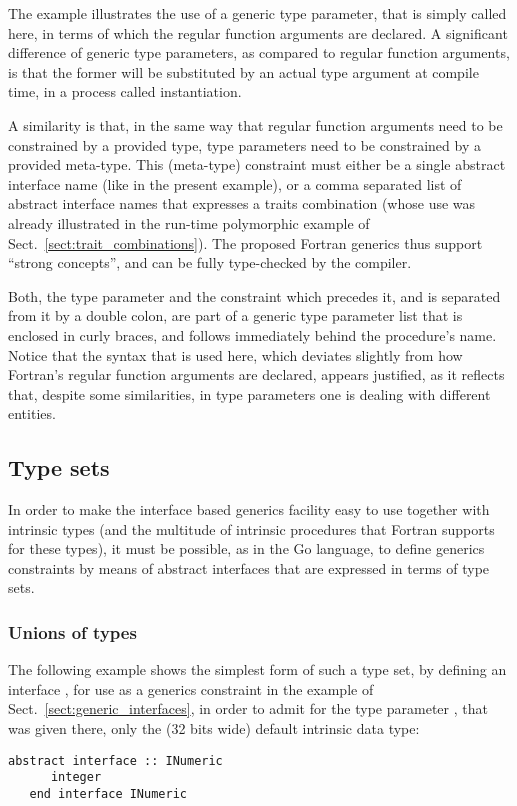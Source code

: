 \documentclass[11pt,oneside]{report}
\newcommand{\code}[1]{{\selectfont\ttfamily{#1}}}
\begin{document}
The example illustrates the use of a generic type parameter, that is
simply called \code{T} here, in terms of which the regular function
arguments are declared. A significant difference of generic type
parameters, as compared to regular function arguments, is that the
former will be substituted by an actual type argument at compile time,
in a process called instantiation.

A similarity is that, in the same way that regular function arguments
need to be constrained by a provided type, type parameters need to be
constrained by a provided meta-type. This (meta-type) constraint must
either be a single abstract interface name (like \code{INumeric} in
the present example), or a comma separated list of abstract interface
names that expresses a traits combination (whose use was already
illustrated in the run-time polymorphic example of
Sect.~\ref{sect:trait_combinations}). The proposed Fortran generics
thus support ``strong concepts'', and can be fully type-checked by the
compiler.

Both, the type parameter and the constraint which precedes it, and is
separated from it by a double colon, are part of a generic type
parameter list that is enclosed in curly braces, and follows
immediately behind the procedure's name. Notice that the syntax that
is used here, which deviates slightly from how Fortran's regular
function arguments are declared, appears justified, as it reflects
that, despite some similarities, in type parameters one is dealing
with different entities.

\subsection{Type sets}
\label{sect:type_sets}

In order to make the interface based generics facility easy to use
together with intrinsic types (and the multitude of intrinsic
procedures that Fortran supports for these types), it must be
possible, as in the Go language, to define generics constraints by
means of abstract interfaces that are expressed in terms of type
sets.

\subsubsection{Unions of types}

The following example shows the simplest form of such a type set, by
defining an interface \code{INumeric}, for use as a generics
constraint in the example of Sect.~\ref{sect:generic_interfaces}, in
order to admit for the type parameter \code{T}, that was given there,
only the (32 bits wide) default \code{integer} intrinsic data type:
\begin{lstlisting}[language=LFortran,style=boxed]
   abstract interface :: INumeric
      integer
   end interface INumeric
\end{lstlisting}
\end{document}
